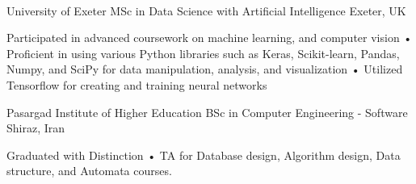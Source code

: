 \\
\vspace{-3mm}
\begin{cventries}

  \cventry
    {University of Exeter} %
    {MSc in Data Science with Artificial Intelligence} %
    {Exeter, UK} %
    {} %
    {
      \begin{cvitems} %
        \item {Participated in advanced coursework on machine learning, and computer vision • Proficient in using various Python libraries such as Keras, Scikit-learn, Pandas, Numpy, and SciPy for data manipulation, analysis, and visualization • Utilized Tensorflow for creating and training neural networks}
      \end{cvitems}
    }
    
  \cventry
    {Pasargad Institute of Higher Education} %
    {BSc in Computer Engineering - Software} %
    {Shiraz, Iran} %
    {} %
    {
      \begin{cvitems} %
        \item {Graduated with Distinction • TA for Database design, Algorithm design, Data structure, and Automata courses.}
      \end{cvitems}
    }
\end{cventries}
